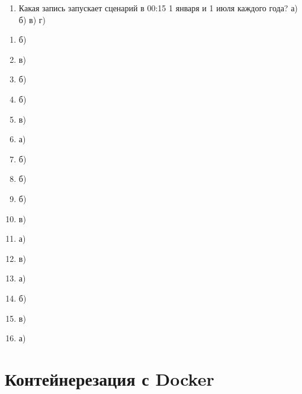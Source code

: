 \documentclass[letterpaper,10pt,russian]{sphinxmanual}
\begin{document}
\begin{enumerate}
\item {} 
\sphinxAtStartPar
Какая запись  запускает сценарий в 00:15 1 января и 1 июля каждого года?
а) 
б) 
в) 
г) 

\end{enumerate}

\sphinxAtStartPar
{}
\begin{enumerate}
%
\item {} 
\sphinxAtStartPar
б)

\item {} 
\sphinxAtStartPar
в)

\item {} 
\sphinxAtStartPar
б)

\item {} 
\sphinxAtStartPar
б)

\item {} 
\sphinxAtStartPar
в)

\item {} 
\sphinxAtStartPar
а)

\item {} 
\sphinxAtStartPar
б)

\item {} 
\sphinxAtStartPar
б)

\item {} 
\sphinxAtStartPar
б)

\item {} 
\sphinxAtStartPar
в)

\item {} 
\sphinxAtStartPar
а)

\item {} 
\sphinxAtStartPar
в)

\item {} 
\sphinxAtStartPar
а)

\item {} 
\sphinxAtStartPar
б)

\item {} 
\sphinxAtStartPar
в)

\item {} 
\sphinxAtStartPar
а)

\end{enumerate}


\chapter{Контейнерезация с Docker}
\label{\detokenize{index:docker}}
\sphinxstepscope
\end{document}
